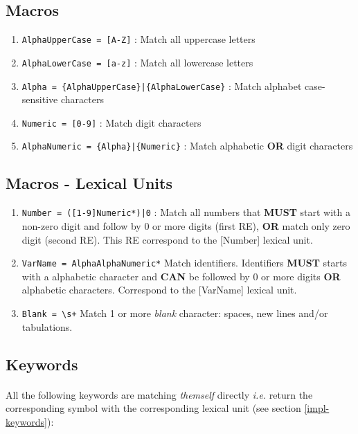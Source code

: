 \documentclass[letterpaper]{article}
\begin{document}
\subsection{Macros}

\begin{enumerate}
    \item \texttt{AlphaUpperCase = [A-Z]} : Match all uppercase letters
    \item \texttt{AlphaLowerCase = [a-z]} : Match all lowercase letters
    \item \texttt{Alpha = \{AlphaUpperCase\}|\{AlphaLowerCase\}} :
    Match alphabet case-sensitive characters
    \item \texttt{Numeric = [0-9]} : Match digit characters
    \item \texttt{AlphaNumeric = \{Alpha\}|\{Numeric\}} :
    Match alphabetic \textbf{OR} digit characters
\end{enumerate}

\subsection{Macros - Lexical Units}
\label{advanced-ere}
\begin{enumerate}
    \item \texttt{Number = ([1-9]{Numeric}*)|0} :
    Match all numbers that \textbf{MUST} start with a non-zero digit and follow
    by 0 or more digits (first RE),
    \textbf{OR} match only zero digit (second RE). This RE correspond to
    the [Number] lexical unit.
    \item \texttt{VarName = {Alpha}{AlphaNumeric}*}
    Match identifiers. Identifiers \textbf{MUST} starts with a alphabetic
    character and \textbf{CAN} be followed by 0 or more digits \textbf{OR}
    alphabetic characters.
    Correspond to the [VarName] lexical unit.
    \item \texttt{Blank = \textbackslash s+} Match 1 or more
    \textit{blank} character: spaces,
    new lines and/or tabulations.
\end{enumerate}

\subsection{Keywords}

\label{ere-keywords}
\paragraph{}
All the following keywords are matching \textit{themself} directly \textit{i.e.}
return the corresponding symbol with the corresponding lexical unit
(see section \ref{impl-keywords}):\\
\end{document}
